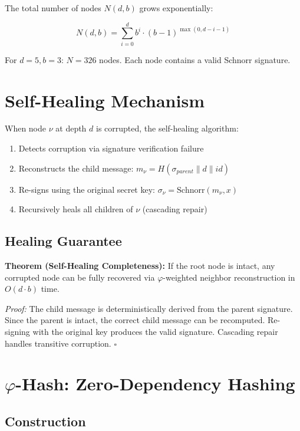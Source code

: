\documentclass{article}
\begin{document}
The total number of nodes $N(d, b)$ grows exponentially:

\begin{equation}
N(d, b) = \sum_{i=0}^{d} b^i \cdot (b-1)^{\max(0, d-i-1)}
\end{equation}

For $d=5, b=3$: $N = 326$ nodes. Each node contains a valid Schnorr signature.

\section{Self-Healing Mechanism}

When node $\nu$ at depth $d$ is corrupted, the self-healing algorithm:

\begin{enumerate}
\item Detects corruption via signature verification failure
\item Reconstructs the child message: $m_{\nu} = H(\sigma_{parent} \parallel d \parallel id)$
\item Re-signs using the original secret key: $\sigma_{\nu} = \text{Schnorr}(m_{\nu}, x)$
\item Recursively heals all children of $\nu$ (cascading repair)
\end{enumerate}

\subsection{Healing Guarantee}

\textbf{Theorem (Self-Healing Completeness):} If the root node is intact, any corrupted node can be fully recovered via $\varphi$-weighted neighbor reconstruction in $O(d \cdot b)$ time.

\textit{Proof:} The child message is deterministically derived from the parent signature. Since the parent is intact, the correct child message can be recomputed. Re-signing with the original key produces the valid signature. Cascading repair handles transitive corruption. $\square$

\section{$\varphi$-Hash: Zero-Dependency Hashing}

\subsection{Construction}
\end{document}
